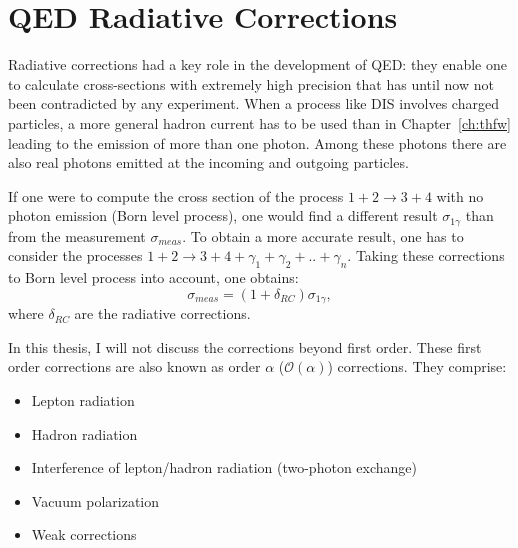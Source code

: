 
\section{QED Radiative Corrections}

Radiative corrections had a key role in the development of QED: they enable one to calculate cross-sections with extremely high precision that has until now not been contradicted by any experiment. When a process like DIS involves charged particles, a more general hadron current has to be used than in Chapter~\ref{ch:thfw} leading to the emission of more than one photon. Among these photons there are also real photons emitted at the incoming and outgoing particles.

If one were to compute the cross section of the process $1+2 \rightarrow 3+4$ with no photon emission (Born level process), one would find a different result $\sigma_{1\gamma}$ than from the measurement $\sigma_{meas}$. To obtain a more accurate result, one has to consider the processes $1+2 \rightarrow 3+4+\gamma_1+\gamma_2+..+\gamma_n$. Taking these corrections to Born level process into account, one obtains:
%
\begin{equation} \label{eq:RC}
  \sigma_{meas} = (1+\delta_{RC})\sigma_{1\gamma},
\end{equation}
%
where $\delta_{RC}$ are the radiative corrections.


In this thesis, I will not discuss the corrections beyond first order. These first order corrections are also known as order $\alpha$ ($\mathscr{O}(\alpha)$) corrections. They comprise:
\begin{itemize}
\item Lepton radiation
\item Hadron radiation
\item Interference of lepton/hadron radiation (two-photon exchange)
\item Vacuum polarization
\item Weak corrections
\end{itemize}

